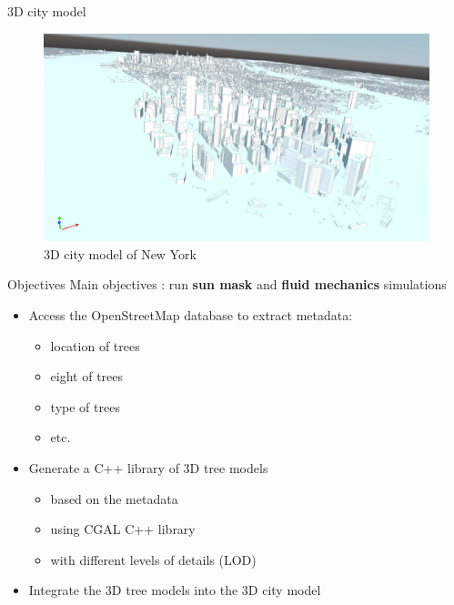 \documentclass[10pt]{beamer}
\begin{document}
\begin{frame}{3D city model}
  \begin{figure}[h] %
    \centering
    \includegraphics[width=1\textwidth]{images/NY_mesh.png}
    \caption{3D city model of New York\cite{img:NY} } %
    \label{fig:city_model} %
  \end{figure} 
\end{frame}

\begin{frame}{Objectives}
  Main objectives : run \textbf{sun mask} and \textbf{fluid mechanics} simulations \\
  \vspace{0.5cm}

  \begin{itemize}
    \item<2-> Access the OpenStreetMap\cite{overpass} database to extract metadata:
    \begin{itemize}
      \item<3-> location of trees
      \item<4-> eight of trees
      \item <5-> type of trees
      \item <6-> etc.
    \end{itemize}
    \item<7-> Generate a C++ library of 3D tree models
    \begin{itemize}
      \item <8-> based on the metadata
      \item <9-> using CGAL\cite{cgal} C++ library 
      \item <10-> with different levels of details (LOD)
    \end{itemize}
    \item<11-> Integrate the 3D tree models into the 3D city model
  \end{itemize}
\end{frame}
\end{document}
